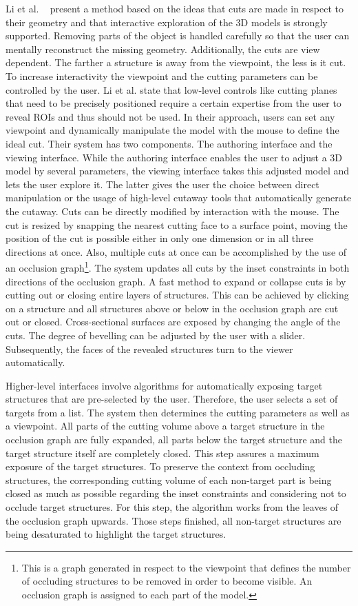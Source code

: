 Li et al. ~\cite{jour:interactiveCutaway} present a method based on the ideas that cuts are made in respect to their geometry and that interactive exploration of the 3D models is strongly supported. Removing parts of the object is handled carefully so that the user can mentally reconstruct the missing geometry. Additionally, the cuts are view dependent. The farther a structure is away from the viewpoint, the less is it cut. To increase interactivity the viewpoint and the cutting parameters can be controlled by the user. Li et al. state that low-level controls like cutting planes that need to be precisely positioned require a certain expertise from the user to reveal ROIs and thus should not be used. In their approach, users can set any viewpoint and dynamically manipulate the model with the mouse to define the ideal cut. Their system has two components. The authoring interface and the viewing interface. While the authoring interface enables the user to adjust a 3D model by several parameters, the viewing interface takes this adjusted model and lets the user explore it. The latter gives the user the choice between direct manipulation or the usage of high-level cutaway tools that automatically generate the cutaway. Cuts can be directly modified by interaction with the mouse. The cut is resized by snapping the nearest cutting face to a surface point, moving the position of the cut is possible either in only one dimension or in all three directions at once. Also, multiple cuts at once can be accomplished by the use of an occlusion graph\footnote{This is a graph generated in respect to the viewpoint that defines the number of occluding structures to be removed in order to become visible. An occlusion graph is assigned to each part of the model.}. The system updates all cuts by the inset constraints in both directions of the occlusion graph. A fast method to expand or collapse cuts is by cutting out or closing entire layers of structures. This can be achieved by clicking on a structure and all structures above or below in the occlusion graph are cut out or closed. Cross-sectional surfaces are exposed by changing the angle of the cuts. The degree of bevelling can be adjusted by the user with a slider. Subsequently, the faces of the revealed structures turn to the viewer automatically.

Higher-level interfaces involve algorithms for automatically exposing target structures that are pre-selected by the user. Therefore, the user selects a set of targets from a list. The system then determines the cutting parameters as well as a viewpoint. All parts of the cutting volume above a target structure in the occlusion graph are fully expanded, all parts below the target structure and the target structure itself are completely closed. This step assures a maximum exposure of the target structures. To preserve the context from occluding structures, the corresponding cutting volume of each non-target part is being closed as much as possible regarding the inset constraints and considering not to occlude target structures. For this step, the algorithm works from the leaves of the occlusion graph upwards. Those steps finished, all non-target structures are being desaturated to highlight the target structures.

